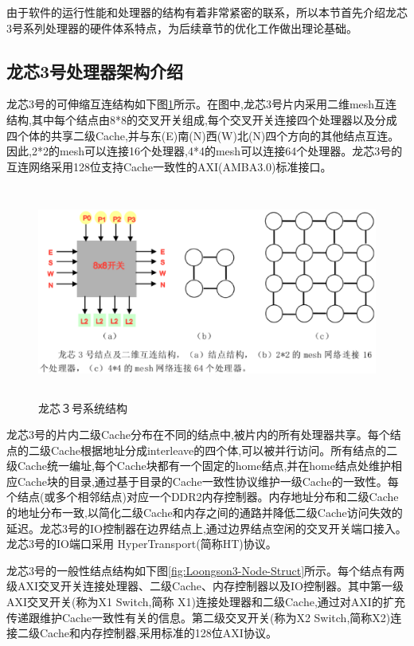 

由于软件的运行性能和处理器的结构有着非常紧密的联系，所以本节首先介绍龙芯3号系列处理器的硬件体系特点，为后续章节的优化工作做出理论基础。

\subsection{龙芯3号处理器架构介绍\cite{Loongson3A-Manual}}

龙芯3号的可伸缩互连结构如下图\ref{fig:Loongson3-System-Struct}所示。在图中,龙芯3号片内采用二维mesh互连结构,其中每个结点由8*8的交叉开关组成,每个交叉开关连接四个处理器以及分成四个体的共享二级Cache,并与东(E)南(N)西(W)北(N)四个方向的其他结点互连。因此,2*2的mesh可以连接16个处理器,4*4的mesh可以连接64个处理器。龙芯3号的互连网络采用128位支持Cache一致性的AXI(AMBA3.0)标准接口。

\begin{figure}[H] 
  \centering
  \includegraphics[width=12cm,height=7cm]{figures/chap02/Loongson3-System-Struct}
  \caption{龙芯３号系统结构}
  \label{fig:Loongson3-System-Struct}
\end{figure}

龙芯3号的片内二级Cache分布在不同的结点中,被片内的所有处理器共享。每个结点的二级Cache根据地址分成interleave的四个体,可以被并行访问。所有结点的二级Cache统一编址,每个Cache块都有一个固定的home结点,并在home结点处维护相应Cache块的目录,通过基于目录的Cache一致性协议维护一级Cache的一致性。每个结点(或多个相邻结点)对应一个DDR2内存控制器。内存地址分布和二级Cache的地址分布一致,以简化二级Cache和内存之间的通路并降低二级Cache访问失效的延迟。龙芯3号的IO控制器在边界结点上,通过边界结点空闲的交叉开关端口接入。龙芯3号的IO端口采用 HyperTransport(简称HT)协议。

龙芯3号的一般性结点结构如下图\ref{fig:Loongson3-Node-Struct}所示。每个结点有两级AXI交叉开关连接处理器、二级Cache、内存控制器以及IO控制器。其中第一级AXI交叉开关(称为X1 Switch,简称 X1)连接处理器和二级Cache,通过对AXI的扩充传递跟维护Cache一致性有关的信息。第二级交叉开关(称为X2 Switch,简称X2)连接二级Cache和内存控制器,采用标准的128位AXI协议。

